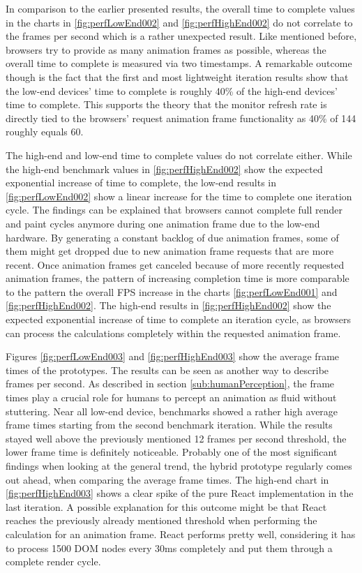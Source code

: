 In comparison to the earlier presented results, the overall time to complete values in the charts in \ref{fig:perfLowEnd002} and \ref{fig:perfHighEnd002} do not correlate to the frames per second which is a rather unexpected result. Like mentioned before, browsers try to provide as many animation frames as possible, whereas the overall time to complete is measured via two timestamps. A remarkable outcome though is the fact that the first and most lightweight iteration results show that the low-end devices' time to complete is roughly 40\% of the high-end devices' time to complete. This supports the theory that the monitor refresh rate is directly tied to the browsers' request animation frame functionality as 40\% of 144 roughly equals 60. 

The high-end and low-end time to complete values do not correlate either. While the high-end benchmark values in \ref{fig:perfHighEnd002} show the expected exponential increase of time to complete, the low-end results in \ref{fig:perfLowEnd002} show a linear increase for the time to complete one iteration cycle. The findings can be explained that browsers cannot complete full render and paint cycles anymore during one animation frame due to the low-end hardware. By generating a constant backlog of due animation frames, some of them might get dropped due to new animation frame requests that are more recent. Once animation frames get canceled because of more recently requested animation frames, the pattern of increasing completion time is more comparable to the pattern the overall FPS increase in the charts \ref{fig:perfLowEnd001} and \ref{fig:perfHighEnd002}. The high-end results in \ref{fig:perfHighEnd002} show the expected exponential increase of time to complete an iteration cycle, as browsers can process the calculations completely within the requested animation frame.

Figures \ref{fig:perfLowEnd003} and \ref{fig:perfHighEnd003} show the average frame times of the prototypes. The results can be seen as another way to describe frames per second. As described in section \ref{sub:humanPerception}, the frame times play a crucial role for humans to percept an animation as fluid without stuttering. Near all low-end device, benchmarks showed a rather high average frame times starting from the second benchmark iteration. While the results stayed well above the previously mentioned 12 frames per second threshold, the lower frame time is definitely noticeable. Probably one of the most significant findings when looking at the general trend, the hybrid prototype regularly comes out ahead, when comparing the average frame times. The high-end chart in \ref{fig:perfHighEnd003} shows a clear spike of the pure React implementation in the last iteration. A possible explanation for this outcome might be that React reaches the previously already mentioned threshold when performing the calculation for an animation frame. React performs pretty well, considering it has to process 1500 DOM nodes every 30ms completely and put them through a complete render cycle.

